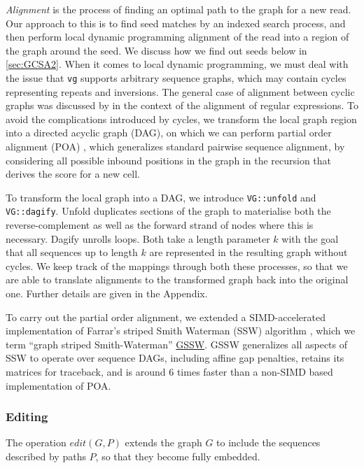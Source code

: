 \documentclass[12pt]{article}
\begin{document}
\emph{Alignment} is the process of finding an optimal path to the graph for a new read.
Our approach to this is to find seed matches by an indexed search process, and then perform local dynamic programming alignment of the 
read into a region of the graph around the seed.  
We discuss how we find out seeds below in \ref{sec:GCSA2}.
When it comes to local dynamic programming, we must deal with the issue that {\tt vg} supports arbitrary sequence graphs, which may contain cycles representing repeats and inversions.  
The general case of alignment between cyclic graphs was discussed by \cite{myers1989} in the context of the alignment of regular expressions.
To avoid the complications introduced by cycles, we transform the local graph region into a directed acyclic graph (DAG), on which we can perform
partial order alignment (POA) \cite{lee2002POA}, which generalizes standard pairwise sequence alignment, by considering all possible inbound 
positions in the graph in the recursion that derives the score for a new cell.

To transform the local graph into a DAG, we introduce {\tt VG::unfold} and {\tt VG::dagify}.  
Unfold duplicates sections of the graph to materialise both the reverse-complement as well as the forward strand of nodes where this is necessary.  
Dagify unrolls loops.  
Both take a length parameter $k$ with the goal that all sequences up to length $k$ are represented in the resulting graph without cycles.
We keep track of the mappings through both these processes, so that we are able to translate alignments to the transformed graph back into the original one.
Further details are given in the Appendix.

To carry out the partial order alignment, we extended a SIMD-accelerated implementation \cite{zhao2013} of Farrar's  striped Smith Waterman (SSW) algorithm \cite{farrar2007}, which we term ``graph striped Smith-Waterman'' \href{https://github.com/ekg/gssw}{GSSW}.
GSSW generalizes all aspects of SSW to operate over sequence DAGs, including affine gap penalties, retains its matrices for traceback, and is around 6 times faster than a non-SIMD based implementation of POA.

\subsubsection{Editing}

The operation $edit(G, P)$ extends the graph $G$ to include the sequences described by paths $P$, so that they become fully embedded.
\end{document}
